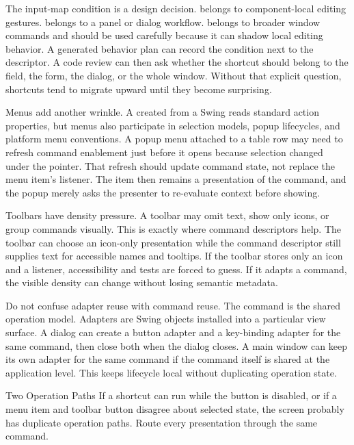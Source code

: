 The input-map condition is a design decision.  belongs to
component-local editing gestures. 
belongs to a panel or dialog workflow.  belongs
to broader window commands and should be used carefully because it can shadow
local editing behavior. A generated behavior plan can record the condition
next to the descriptor. A code review can then ask whether the shortcut should
belong to the field, the form, the dialog, or the whole window. Without that
explicit question, shortcuts tend to migrate upward until they become
surprising.

Menus add another wrinkle. A  created from a Swing
 reads standard action properties, but menus also participate in
selection models, popup lifecycles, and platform menu conventions. A popup
menu attached to a table row may need to refresh command enablement just
before it opens because selection changed under the pointer. That refresh
should update command state, not replace the menu item's listener. The item
then remains a presentation of the command, and the popup merely asks the
presenter to re-evaluate context before showing.

Toolbars have density pressure. A toolbar may omit text, show only icons, or
group commands visually. This is exactly where command descriptors help. The
toolbar can choose an icon-only presentation while the command descriptor
still supplies text for accessible names and tooltips. If the toolbar stores
only an icon and a listener, accessibility and tests are forced to guess. If
it adapts a command, the visible density can change without losing semantic
metadata.

Do not confuse adapter reuse with command reuse. The command is the shared
operation model. Adapters are Swing objects installed into a particular view
surface. A dialog can create a button adapter and a key-binding adapter for
the same command, then close both when the dialog closes. A main window can
keep its own adapter for the same command if the command itself is shared at
the application level. This keeps lifecycle local without duplicating
operation state.

\begin{pitfallbox}{Two Operation Paths}
If a shortcut can run while the button is disabled, or if a menu item and
toolbar button disagree about selected state, the screen probably has duplicate
operation paths. Route every presentation through the same command.
\end{pitfallbox}


